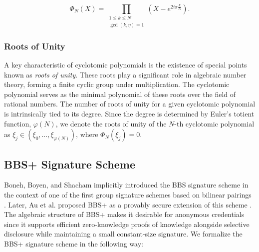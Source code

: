 \begin{equation}
\label{eq:prelim_cyclotomic_poly}
\Phi_N(X)=\prod_{\substack{1 \leq k \leq N \\ \operatorname{gcd}(k, \eta)=1}}\left(X-e^{2 i \pi \frac{k}{N}}\right).
\end{equation}

\subsubsection{Roots of Unity}
A key characteristic of cyclotomic polynomials is the existence of special points known as \textit{roots of unity}. These roots play a significant role in algebraic number theory, forming a finite cyclic group under multiplication. The cyclotomic polynomial serves as the minimal polynomial of these roots over the field of rational numbers. The number of roots of unity for a given cyclotomic polynomial is intrinsically tied to its degree. Since the degree is determined by Euler's totient function, $\varphi(N)$, we denote the roots of unity of the $N$-th cyclotomic polynomial as $\xi_j \in (\xi_0, \ldots, \xi_{\varphi(N)})$, where $\Phi_N(\xi_j) = 0$. 


\subsection{BBS+ Signature Scheme}
\label{subsec:prelim_bbs}
Boneh, Boyen, and Shacham implicitly introduced the BBS signature scheme in the context of one of the first group signature schemes based on bilinear pairings \cite{boneh2004short}. Later, Au et al. proposed BBS+ as a provably secure extension of this scheme \cite{au2006constant}. The algebraic structure of BBS+ makes it desirable for anonymous credentials since it supports efficient zero-knowledge proofs of knowledge alongside selective disclosure while maintaining a small constant-size signature. We formalize the BBS+ signature scheme in the following way:

